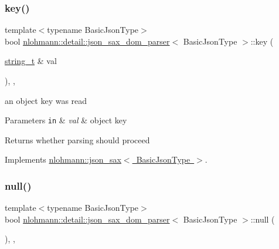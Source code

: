 \subsubsection{\texorpdfstring{key()}{key()}}
{\footnotesize\ttfamily template$<$typename Basic\+Json\+Type$>$ \\
bool \mbox{\hyperlink{classnlohmann_1_1detail_1_1json__sax__dom__parser}{nlohmann\+::detail\+::json\+\_\+sax\+\_\+dom\+\_\+parser}}$<$ Basic\+Json\+Type $>$\+::key (\begin{DoxyParamCaption}\item[{\mbox{\hyperlink{structnlohmann_1_1json__sax_ae01977a9f3c5b3667b7a2929ed91061e}{string\+\_\+t}} \&}]{val }\end{DoxyParamCaption})\hspace{0.3cm}{\ttfamily [inline]}, {\ttfamily [override]}, {\ttfamily [virtual]}}



an object key was read 


\begin{DoxyParams}[1]{Parameters}
\mbox{\tt in}  & {\em val} & object key \\
\hline
\end{DoxyParams}
\begin{DoxyReturn}{Returns}
whether parsing should proceed 
\end{DoxyReturn}


Implements \mbox{\hyperlink{structnlohmann_1_1json__sax_a2e0c7ecd80b18d18a8cc76f71cfc2028}{nlohmann\+::json\+\_\+sax$<$ Basic\+Json\+Type $>$}}.

\mbox{\label{classnlohmann_1_1detail_1_1json__sax__dom__parser_a0ec9faafc4b8d4052a6ed6d3b720d748}} 
\subsubsection{\texorpdfstring{null()}{null()}}
{\footnotesize\ttfamily template$<$typename Basic\+Json\+Type$>$ \\
bool \mbox{\hyperlink{classnlohmann_1_1detail_1_1json__sax__dom__parser}{nlohmann\+::detail\+::json\+\_\+sax\+\_\+dom\+\_\+parser}}$<$ Basic\+Json\+Type $>$\+::null (\begin{DoxyParamCaption}{ }\end{DoxyParamCaption})\hspace{0.3cm}{\ttfamily [inline]}, {\ttfamily [override]}, {\ttfamily [virtual]}}



